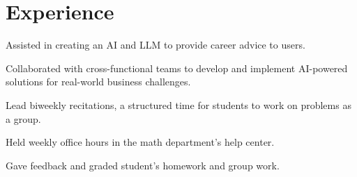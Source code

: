 \documentclass[letterpaper]{AMcEnaneyResume} %
\begin{document}
\begin{minipage}[t]{0.66\textwidth} %


\section{Experience}


        \vspace{\topsep} %
        \begin{tightitemize}
            \item Assisted in creating an AI and LLM to provide career advice to users.
            \item Collaborated with cross-functional teams to develop and implement AI-powered solutions for real-world business challenges.
        \end{tightitemize}

        \sectionspace %



        \begin{tightitemize}
            \item Lead biweekly recitations, a structured time for students to work on problems as a group.
            \item Held weekly office hours in the math department's help center.
            \item Gave feedback and graded student's homework and group work.
        \end{tightitemize}

        \sectionspace %




\end{minipage}
\end{document}
